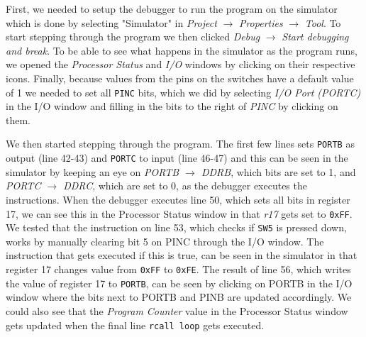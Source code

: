 First, we needed to setup the debugger to run the program on the simulator which is done by selecting "Simulator" in \emph{Project} $\rightarrow$ \emph{Properties} $\rightarrow$ \emph{Tool}. To start stepping through the program we then clicked \emph{Debug} $\rightarrow$ \emph{Start debugging and break}. To be able to see what happens in the simulator as the program runs, we opened the \emph{Processor Status} and \emph{I/O} windows by clicking on their respective icons. Finally, because values from the pins on the switches have a default value of 1 we needed to set all \texttt{PINC} bits, which we did by selecting \emph{I/O Port (PORTC)} in the I/O window and filling in the bits to the right of \emph{PINC} by clicking on them.

We then started stepping through the program. The first few lines sets \texttt{PORTB} as output (line 42-43) and \texttt{PORTC} to input (line 46-47) and this can be seen in the simulator by keeping an eye on \emph{PORTB $\rightarrow$ DDRB}, which bits are set to 1, and \emph{PORTC $\rightarrow$ DDRC}, which are set to 0, as the debugger executes the instructions. When the debugger executes line 50, which sets all bits in register 17, we can see this in the Processor Status window in that \emph{r17} gets set to \texttt{0xFF}. We tested that the instruction on line 53, which checks if \texttt{SW5} is pressed down, works by manually clearing bit 5 on PINC through the I/O window. The instruction that gets executed if this is true, can be seen in the simulator in that register 17 changes value from \texttt{0xFF} to \texttt{0xFE}. The result of line 56, which writes the value of register 17 to \texttt{PORTB}, can be seen by clicking on PORTB in the I/O window where the bits next to PORTB and PINB are updated accordingly. We could also see that the \emph{Program Counter} value in the Processor Status window gets updated when the final line \texttt{rcall loop} gets executed.
